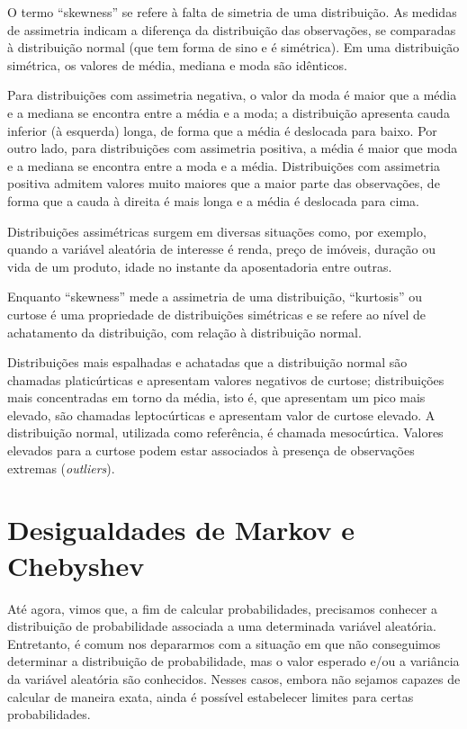 \documentclass[
]{book}
\theoremstyle{definition}
\theoremstyle{definition}
\theoremstyle{definition}
\theoremstyle{remark}
\begin{document}
O termo ``skewness'' se refere à falta de simetria de uma distribuição. As medidas de assimetria indicam a diferença da distribuição das observações, se comparadas à distribuição normal (que tem forma de sino e é simétrica). Em uma distribuição simétrica, os valores de média, mediana e moda são idênticos.

Para distribuições com assimetria negativa, o valor da moda é maior que a média e a mediana se encontra entre a média e a moda; a distribuição apresenta cauda inferior (à esquerda) longa, de forma que a média é deslocada para baixo. Por outro lado, para distribuições com assimetria positiva, a média é maior que moda e a mediana se encontra entre a moda e a média. Distribuições com assimetria positiva admitem valores muito maiores que a maior parte das observações, de forma que a cauda à direita é mais longa e a média é deslocada para cima.

Distribuições assimétricas surgem em diversas situações como, por exemplo, quando a variável aleatória de interesse é renda, preço de imóveis, duração ou vida de um produto, idade no instante da aposentadoria entre outras.

Enquanto ``skewness'' mede a assimetria de uma distribuição, ``kurtosis'' ou curtose é uma propriedade de distribuições simétricas e se refere ao nível de achatamento da distribuição, com relação à distribuição normal.

Distribuições mais espalhadas e achatadas que a distribuição normal são chamadas platicúrticas e apresentam valores negativos de curtose; distribuições mais concentradas em torno da média, isto é, que apresentam um pico mais elevado, são chamadas leptocúrticas e apresentam valor de curtose elevado. A distribuição normal, utilizada como referência, é chamada mesocúrtica. Valores elevados para a curtose podem estar associados à presença de observações extremas (\emph{outliers}).

\hypertarget{desigualdades-de-markov-e-chebyshev}{%
\section{Desigualdades de Markov e Chebyshev}\label{desigualdades-de-markov-e-chebyshev}}

Até agora, vimos que, a fim de calcular probabilidades, precisamos conhecer a distribuição de probabilidade associada a uma determinada variável aleatória. Entretanto, é comum nos depararmos com a situação em que não conseguimos determinar a distribuição de probabilidade, mas o valor esperado e/ou a variância da variável aleatória são conhecidos. Nesses casos, embora não sejamos capazes de calcular de maneira exata, ainda é possível estabelecer limites para certas probabilidades.
\end{document}

